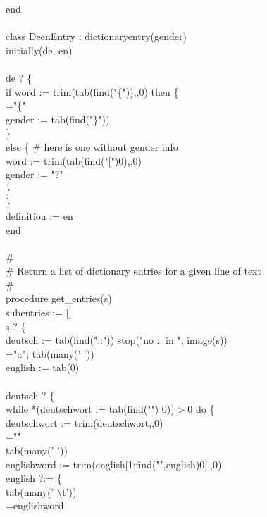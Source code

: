 {end \\
\ \\
class DeenEntry : dictionaryentry(gender) \\
initially(de, en) \\
\ \\
\>   de ? \{ \\
\>\>      if word := trim(tab(find("\{")),,0) then \{ \\
\>\>\>	 ="\{" \\
\>\>\>	 gender := tab(find("\}")) \\
\>\>\>	 \} \\
\>\>      else \{ \# here is one without gender info \\
\>\>\>	 word := trim(tab(find("["){\textbar}0),,0) \\
\>\>\>	 gender := "?" \\
\>\>\>	 \} \\
\>      \} \\
\>   definition := en \\
end \\
\ \\
\# \\
\# Return a list of dictionary entries for a given line of text \\
\# \\
procedure get\_entries(s) \\
\>   subentries := [] \\
\>   s ? \{ \\
\>\>      deutsch := tab(find("::")) {\textbar} stop("no :: in ", image(s)) \\
\>\>      ="::"; tab(many(' ')) \\
\>\>      english := tab(0) \\
\>\>\ \\
\>\>      deutsch ? \{ \\
\>\>\>	 while *(deutschwort := tab(find("{\textbar}") {\textbar} 0))$>$0 do \{ \\
\>\>\>\>	    deutschwort := trim(deutschwort,,0) \\
\>\>\>\>	    ="{\textbar}" \\
\>\>\>\>	    tab(many(' ')) \\
\>\>\>\>	    englishword := trim(english[1:find("{\textbar}",english){\textbar}0],,0) \\
\>\>\>\>	    english ?:= \{ \\
\>\>\>\>\>	       tab(many(' {\textbackslash}t')) \\
\>\>\>\>\>	       =englishword \\
}
